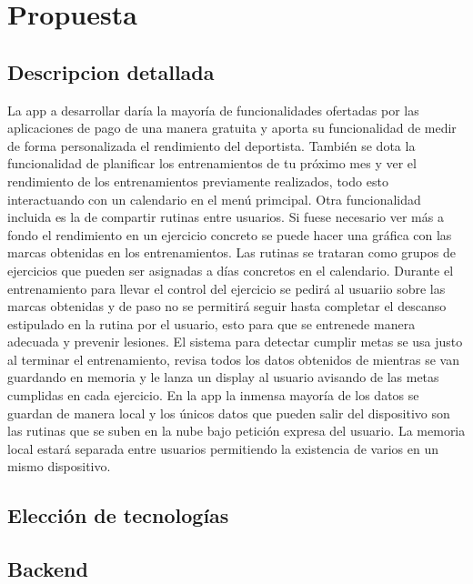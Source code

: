 \chapter{Propuesta}

\section{Descripcion detallada}

La app a desarrollar daría la mayoría de funcionalidades ofertadas por las aplicaciones de pago de una manera gratuita y aporta su funcionalidad de medir de forma personalizada el rendimiento del deportista. También se dota la funcionalidad de planificar los entrenamientos de tu próximo mes y ver el rendimiento de los entrenamientos previamente realizados, todo esto interactuando con un calendario en el menú primcipal. Otra funcionalidad incluida es la de compartir rutinas entre usuarios. Si fuese necesario ver más a fondo el rendimiento en un ejercicio concreto se puede hacer una gráfica con las marcas obtenidas en los entrenamientos. Las rutinas se trataran como grupos de ejercicios que pueden ser asignadas a días concretos en el calendario. Durante el entrenamiento para llevar el control del ejercicio se pedirá al usuariio sobre las marcas obtenidas y de paso no se permitirá seguir hasta completar el descanso estipulado en la rutina por el usuario, esto para que se entrenede manera adecuada y prevenir lesiones. El sistema para detectar cumplir metas se usa justo al terminar el entrenamiento, revisa todos los datos obtenidos de mientras se van guardando en memoria y le lanza un display al usuario avisando de las metas cumplidas en cada ejercicio. En la app la inmensa mayoría de los datos se guardan de manera local y los únicos datos que pueden salir del dispositivo son las rutinas que se suben en la nube bajo petición expresa del usuario. La memoria local estará separada entre usuarios permitiendo la existencia de varios en un mismo dispositivo.

\section{Elección de tecnologías}

\section{Backend}

